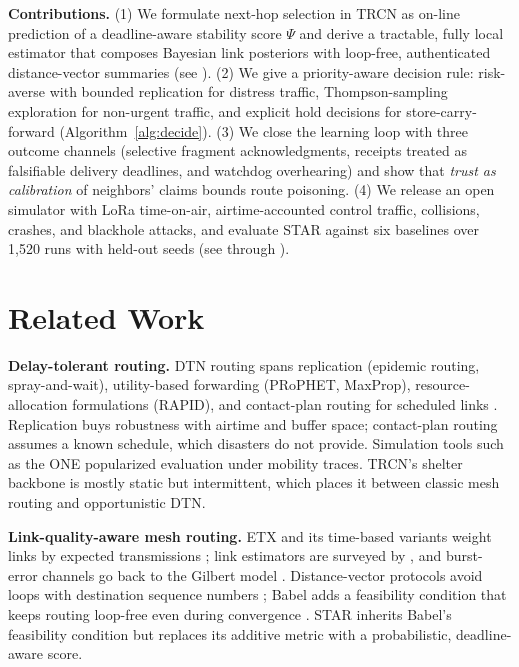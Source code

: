 \documentclass[jou,a4paper,11pt,floatsintext]{apa7}
\begin{document}
\textbf{Contributions.} (1) We formulate next-hop selection in TRCN as on-line prediction of a deadline-aware stability score $\Psi$ and derive a tractable, fully local estimator that composes Bayesian link posteriors with loop-free, authenticated distance-vector summaries (see ). (2) We give a priority-aware decision rule: risk-averse with bounded replication for distress traffic, Thompson-sampling exploration for non-urgent traffic, and explicit hold decisions for store-carry-forward (Algorithm~\ref{alg:decide}). (3) We close the learning loop with three outcome channels (selective fragment acknowledgments, receipts treated as falsifiable delivery deadlines, and watchdog overhearing) and show that \emph{trust as calibration} of neighbors' claims bounds route poisoning. (4) We release an open simulator with LoRa time-on-air, airtime-accounted control traffic, collisions, crashes, and blackhole attacks, and evaluate STAR against six baselines over 1{,}520 runs with held-out seeds (see  through ).

\section{Related Work}

\textbf{Delay-tolerant routing.} DTN routing \parencite{fall2003,jain2004} spans replication (epidemic routing, spray-and-wait), utility-based forwarding (PRoPHET, MaxProp), resource-allocation formulations (RAPID), and contact-plan routing for scheduled links \parencite{vahdat2000,spyropoulos2005,lindgren2003,burgess2006,balasubramanian2007,fraire2021}. Replication buys robustness with airtime and buffer space; contact-plan routing assumes a known schedule, which disasters do not provide. Simulation tools such as the ONE \parencite{keranen2009} popularized evaluation under mobility traces. TRCN's shelter backbone is mostly static but intermittent, which places it between classic mesh routing and opportunistic DTN.

\textbf{Link-quality-aware mesh routing.} ETX and its time-based variants weight links by expected transmissions \parencite{decouto2003}; link estimators are surveyed by \textcite{baccour2012}, and burst-error channels go back to the Gilbert model \parencite{gilbert1960}. Distance-vector protocols avoid loops with destination sequence numbers \parencite{perkins1994}; Babel adds a feasibility condition that keeps routing loop-free even during convergence \parencite{rfc8966}. STAR inherits Babel's feasibility condition but replaces its additive metric with a probabilistic, deadline-aware score.
\end{document}
